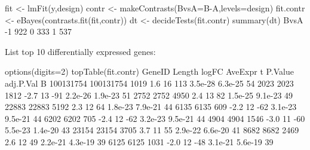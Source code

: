 \documentclass[12pt]{report}
\begin{document}
\begin{Rcode}
fit <- lmFit(y,design)
contr <- makeContrasts(BvsA=B-A,levels=design)
fit.contr <- eBayes(contrasts.fit(fit,contr))
dt <- decideTests(fit.contr)
summary(dt)
   BvsA
-1  922
0   333
1   537
\end{Rcode}

List top 10 differentially expressed genes: 

\begin{Rcode}
options(digits=2)
topTable(fit.contr)
             GeneID Length logFC AveExpr   t P.Value adj.P.Val  B
100131754 100131754   1019   1.6      16 113 3.5e-28   6.3e-25 54
2023           2023   1812  -2.7      13 -91 2.2e-26   1.9e-23 51
2752           2752   4950   2.4      13  82 1.5e-25   9.1e-23 49
22883         22883   5192   2.3      12  64 1.8e-23   7.9e-21 44
6135           6135    609  -2.2      12 -62 3.1e-23   9.5e-21 44
6202           6202    705  -2.4      12 -62 3.2e-23   9.5e-21 44
4904           4904   1546  -3.0      11 -60 5.5e-23   1.4e-20 43
23154         23154   3705   3.7      11  55 2.9e-22   6.6e-20 41
8682           8682   2469   2.6      12  49 2.2e-21   4.3e-19 39
6125           6125   1031  -2.0      12 -48 3.1e-21   5.6e-19 39
\end{Rcode}




\end{document}
